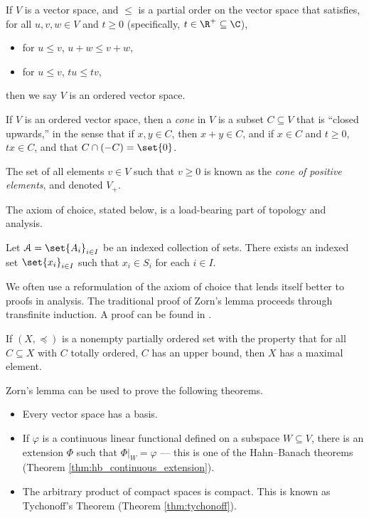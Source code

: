 \begin{example}\label{ex:ordered_vector_space}
  If $V$ is a vector space, and $\leq$ is a partial order on the vector space that satisfies, for all $u,v,w\in V$ and $t\geq 0$ (specifically, $t\in \R^{+}\subseteq \C$),
  \begin{itemize}
    \item for $u\leq v$, $u + w \leq v + w$,
    \item for $u\leq v$, $tu \leq tv$,
  \end{itemize}
  then we say $V$ is an ordered vector space.\newline

  If $V$ is an ordered vector space, then a \textit{cone} in $V$ is a subset $C\subseteq V$ that is ``closed upwards,'' in the sense that if $x,y\in C$, then $x+y\in C$, and if $x\in C$ and $t\geq 0$, $tx\in C$, and that $C\cap \left(-C\right) = \set{0}$.\newline

  The set of all elements $v\in V$ such that $v\geq 0$ is known as the \textit{cone of positive elements}, and denoted $V_{+}$.
\end{example}

The axiom of choice, stated below, is a load-bearing part of topology and analysis.
\begin{definition}
  Let $\mathcal{A} = \set{A_i}_{i\in I}$ be an indexed collection of sets. There exists an indexed set $\set{x_i}_{i\in I}$ such that $x_i\in S_i$ for each $i\in I$.
\end{definition}
We often use a reformulation of the axiom of choice that lends itself better to proofs in analysis. The traditional proof of Zorn's lemma proceeds through transfinite induction. A proof can be found in \cite[40]{jech_set_theory}.
\begin{theorem}\label{thm:zorns_lemma}
  If $\left(X,\preceq\right)$ is a nonempty partially ordered set with the property that for all $C\subseteq X$ with $C$ totally ordered, $C$ has an upper bound, then $X$ has a maximal element.
\end{theorem}
Zorn's lemma can be used to prove the following theorems.
\begin{example}\label{ex:results_follow_from_axiom_of_choice}\hfill
  \begin{itemize}
    \item Every vector space has a basis.
    \item If $\varphi$ is a continuous linear functional defined on a subspace $W\subseteq V$, there is an extension $\Phi$ such that $\Phi|_{W} = \varphi$ --- this is one of the Hahn--Banach theorems (Theorem \ref{thm:hb_continuous_extension}). %
    \item The arbitrary product of compact spaces is compact. This is known as Tychonoff's Theorem (Theorem \ref{thm:tychonoff}). %
  \end{itemize}
\end{example}
